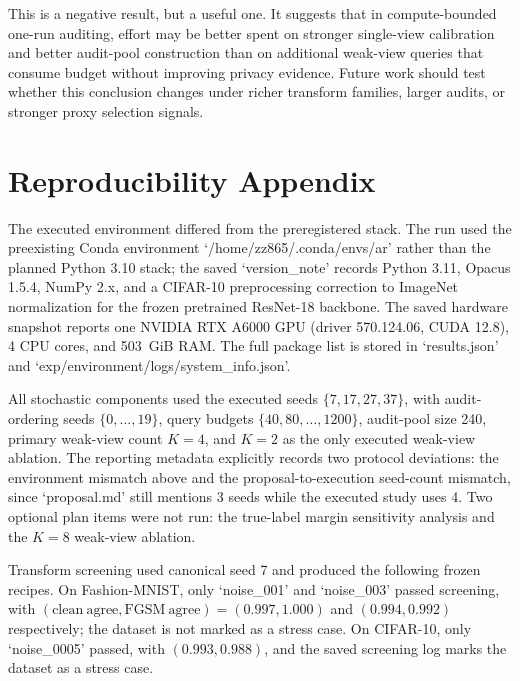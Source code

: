 \documentclass{article}
\begin{document}
This is a negative result, but a useful one. It suggests that in compute-bounded one-run auditing, effort may be better spent on stronger single-view calibration and better audit-pool construction than on additional weak-view queries that consume budget without improving privacy evidence. Future work should test whether this conclusion changes under richer transform families, larger audits, or stronger proxy selection signals.

\appendix

\section{Reproducibility Appendix}
\label{app:repro}

The executed environment differed from the preregistered stack. The run used the preexisting Conda environment `/home/zz865/.conda/envs/ar' rather than the planned Python 3.10 stack; the saved `version\_note' records Python 3.11, Opacus 1.5.4, NumPy 2.x, and a CIFAR-10 preprocessing correction to ImageNet normalization for the frozen pretrained ResNet-18 backbone. The saved hardware snapshot reports one NVIDIA RTX A6000 GPU (driver 570.124.06, CUDA 12.8), 4 CPU cores, and 503~GiB RAM. The full package list is stored in `results.json' and `exp/environment/logs/system\_info.json'.

All stochastic components used the executed seeds \(\{7,17,27,37\}\), with audit-ordering seeds \(\{0,\dots,19\}\), query budgets \(\{40,80,\dots,1200\}\), audit-pool size 240, primary weak-view count \(K=4\), and \(K=2\) as the only executed weak-view ablation. The reporting metadata explicitly records two protocol deviations: the environment mismatch above and the proposal-to-execution seed-count mismatch, since `proposal.md' still mentions 3 seeds while the executed study uses 4. Two optional plan items were not run: the true-label margin sensitivity analysis and the \(K=8\) weak-view ablation.

Transform screening used canonical seed 7 and produced the following frozen recipes. On Fashion-MNIST, only `noise\_001' and `noise\_003' passed screening, with \((\mathrm{clean\ agree}, \mathrm{FGSM\ agree})=(0.997,1.000)\) and \((0.994,0.992)\) respectively; the dataset is not marked as a stress case. On CIFAR-10, only `noise\_0005' passed, with \((0.993,0.988)\), and the saved screening log marks the dataset as a stress case.
\end{document}
